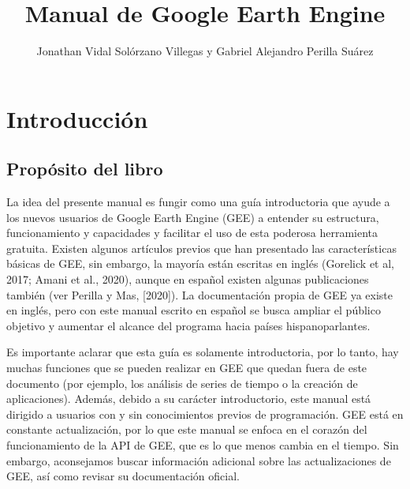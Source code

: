 \documentclass[
  12pt,
  letterpaper,
  twoside]{book}
\title{Manual de Google Earth Engine}
\author{Jonathan Vidal Solórzano Villegas y Gabriel Alejandro Perilla Suárez}
\date{}
\renewcommand\headrulewidth{0pt}
\begin{document}
\maketitle

\renewcommand*\contentsname{Índice}
{
\hypersetup{linkcolor=black}
\setcounter{tocdepth}{1}
\tableofcontents
}
\setlength{\aweboxleftmargin}{0.1\linewidth}
\setlength{\aweboxcontentwidth}{0.85\linewidth}
\setlength{\aweboxvskip}{1mm}
\setlength{\aweboxrulewidth}{5pt}

\newpage
\mainmatter

\renewcommand\headrulewidth{1pt}
\pagestyle{fancy} 
  \fancyfoot{}
  \fancyfoot[LE,RO]{\thepage}
  \fancyhead{}
  \fancyhead[LE,RO]{\leftmark}
  \fancyhead[LO,RE]{\rightmark}

\hypertarget{introducciuxf3n}{%
\chapter{Introducción}\label{introducciuxf3n}}

\hypertarget{propuxf3sito-del-libro}{%
\section{Propósito del libro}\label{propuxf3sito-del-libro}}

La idea del presente manual es fungir como una guía introductoria que ayude a los nuevos usuarios de Google Earth Engine (GEE) a entender su estructura, funcionamiento y capacidades y facilitar el uso de esta poderosa herramienta gratuita. Existen algunos artículos previos que han presentado las características básicas de GEE, sin embargo, la mayoría están escritas en inglés (Gorelick et al, 2017; Amani et al., 2020), aunque en español existen algunas publicaciones también (ver Perilla y Mas, {[}2020{]}). La documentación propia de GEE ya existe en inglés, pero con este manual escrito en español se busca ampliar el público objetivo y aumentar el alcance del programa hacia países hispanoparlantes.

Es importante aclarar que esta guía es solamente introductoria, por lo tanto, hay muchas funciones que se pueden realizar en GEE que quedan fuera de este documento (por ejemplo, los análisis de series de tiempo o la creación de aplicaciones). Además, debido a su carácter introductorio, este manual está dirigido a usuarios con y sin conocimientos previos de programación. GEE está en constante actualización, por lo que este manual se enfoca en el corazón del funcionamiento de la API de GEE, que es lo que menos cambia en el tiempo. Sin embargo, aconsejamos buscar información adicional sobre las actualizaciones de GEE, así como revisar su documentación oficial.
\end{document}
